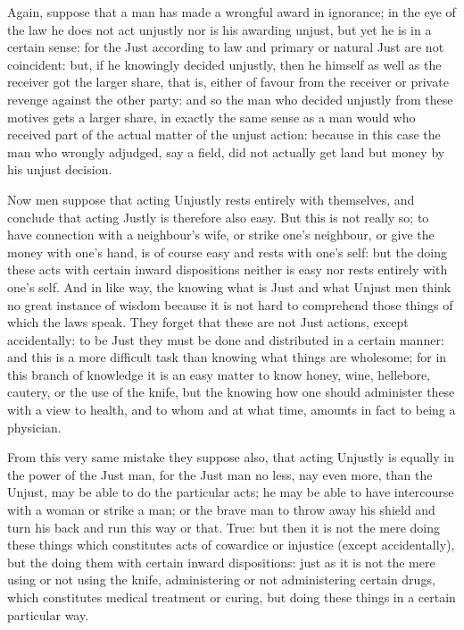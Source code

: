 Again, suppose that a man has made a wrongful award in ignorance; in the eye of
the law he does not act unjustly nor is his awarding unjust, but yet he is in a
certain sense: for the Just according to law and primary or natural Just are
not coincident: but, if he knowingly decided unjustly, then he himself as well
as the receiver got the larger share, that is, either of favour from the
receiver or private revenge against the other party: and so the man who decided
unjustly from these motives gets a larger share, in exactly the same sense as a
man would who received part of the actual matter of the unjust action: because
in this case the man who wrongly adjudged, say a field, did not actually get
land but money by his unjust decision.


Now men suppose that acting Unjustly rests entirely with themselves, and
conclude that acting Justly is therefore also easy. But this is not really so;
to have connection with a neighbour’s wife, or strike one’s
neighbour, or give the money with one’s hand, is of course easy and rests
with one’s self: but the doing these acts with certain inward
dispositions neither is easy nor rests entirely with one’s self. And in
like way, the knowing what is Just and what Unjust men think no great instance
of wisdom because it is not hard to comprehend those things of which the laws
speak. They forget that these are not Just actions, except accidentally: to be
Just they must be done and distributed in a certain manner: and this is a more
difficult task than knowing what things are wholesome; for in this branch of
knowledge it is an easy matter to know honey, wine, hellebore, cautery, or the
use of the knife, but the knowing how one should administer these with a view
to health, and to whom and at what time, amounts in fact to being a physician.

From this very same mistake they suppose also, that acting Unjustly is equally
in the power of the Just man, for the Just man no less, nay even more, than the
Unjust, may be able to do the particular acts; he may be able to have
intercourse with a woman or strike a man; or the brave man to throw away his
shield and turn his back and run this way or that. True: but then it is not the
mere doing these things which constitutes acts of cowardice or injustice
(except accidentally), but the doing them with certain inward dispositions:
just as it is not the mere using or not using the knife, administering or not
administering certain drugs, which constitutes medical treatment or curing, but
doing these things in a certain particular way.

